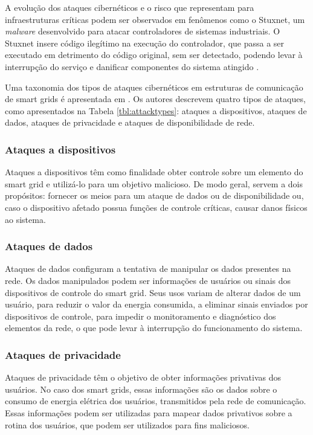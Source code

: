 \documentclass[cic,tc]{iiufrgs}
\begin{document}
A evolução dos ataques cibernéticos e o risco que representam para infraestruturas críticas podem ser observados em fenômenos como o Stuxnet, um \textit{malware} desenvolvido para atacar controladores de sistemas industriais. O Stuxnet insere código ilegítimo na execução do controlador, que passa a ser executado em detrimento do código original, sem ser detectado, podendo levar à interrupção do serviço e danificar componentes do sistema atingido \cite{langner2011stuxnet}.

Uma taxonomia dos tipos de ataques cibernéticos em estruturas de comunicação de smart grids é apresentada em \cite{li2012securing}. Os autores descrevem quatro tipos de ataques, como apresentados na Tabela \ref{tbl:attacktypes}: ataques a dispositivos, ataques de dados, ataques de privacidade e ataques de disponibilidade de rede.

\subsubsection{Ataques a dispositivos}
Ataques a dispositivos têm como finalidade obter controle sobre um elemento do smart grid e utilizá-lo para um objetivo malicioso. De modo geral, servem a dois propósitos: fornecer os meios para um ataque de dados ou de disponibilidade ou, caso o dispositivo afetado possua funções de controle críticas, causar danos físicos ao sistema.

\subsubsection{Ataques de dados}
Ataques de dados configuram a tentativa de manipular os dados presentes na rede. Os dados manipulados podem ser informações de usuários ou sinais dos dispositivos de controle do smart grid. Seus usos variam de alterar dados de um usuário, para reduzir o valor da energia consumida, a eliminar sinais enviados por dispositivos de controle, para impedir o monitoramento e diagnóstico dos elementos da rede, o que pode levar à interrupção do funcionamento do sistema.

\subsubsection{Ataques de privacidade}
Ataques de privacidade têm o objetivo de obter informações privativas dos usuários. No caso dos smart grids, essas informações são os dados sobre o consumo de energia elétrica dos usuários, transmitidos pela rede de comunicação. Essas informações podem ser utilizadas para mapear dados privativos sobre a rotina dos usuários, que podem ser utilizados para fins maliciosos.
\end{document}
